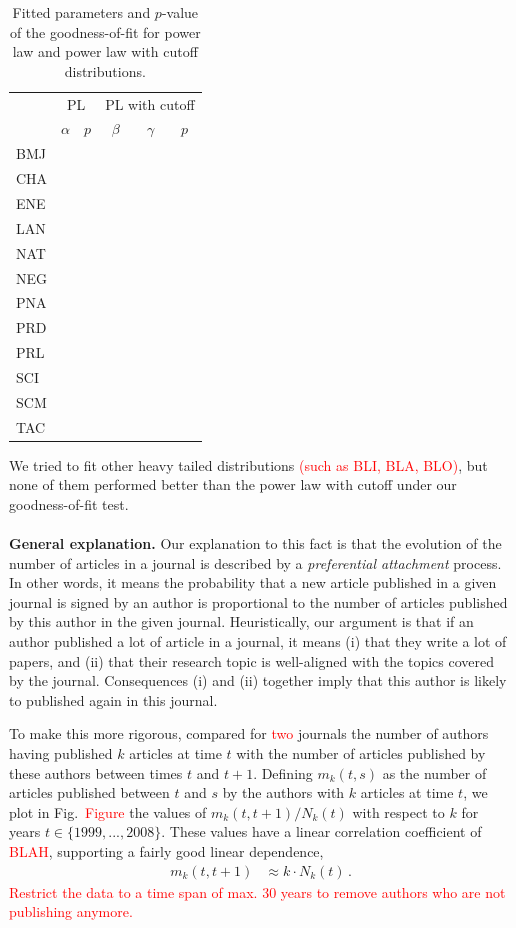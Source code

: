 \documentclass[aps,prl,floatfix,twocolumn]{revtex4-1}
\begin{document}
\begin{table}
 \begin{tabular}{l||c|c||c|c|c}
  & \multicolumn{2}{c||}{PL} & \multicolumn{3}{c}{PL with cutoff} \\
  & $\alpha$ & $p$ & $\beta$ & $\gamma$ & $p$ \\
  \hline
  \hline BMJ & &&&& \\
  \hline CHA & &&&& \\
  \hline ENE & &&&& \\
  \hline LAN & &&&& \\
  \hline NAT & &&&& \\
  \hline NEG & &&&& \\
  \hline PNA & &&&& \\
  \hline PRD & &&&& \\
  \hline PRL & &&&& \\
  \hline SCI & &&&& \\
  \hline SCM & &&&& \\
  \hline TAC & &&&&
 \end{tabular}
 \caption{Fitted parameters and $p$-value of the goodness-of-fit for power law and power law with cutoff distributions.}
 \label{tab:fit_gof}
\end{table}

We tried to fit other heavy tailed distributions \textcolor{red}{(such as BLI, BLA, BLO)}, but none of them performed better than the power law with cutoff under our goodness-of-fit test. 


\paragraph{}
{\bf General explanation. }
Our explanation to this fact is that the evolution of the number of articles in a journal is described by a \emph{preferential attachment} process. 
In other words, it means the probability that a new article published in a given journal 
is signed by an author is proportional to the number of articles published by this author in the given journal. 
Heuristically, our argument is that if an author published a lot of article in a journal, it means (i) that they write a lot of papers, 
and (ii) that their research topic is well-aligned with the topics covered by the journal. 
Consequences (i) and (ii) together imply that this author is likely to published again in this journal. 

To make this more rigorous, compared for \textcolor{red}{two} journals the number of authors having published $k$ articles at time $t$ 
with the number of articles published by these authors between times $t$ and $t+1$. 
Defining $m_k(t,s)$ as the number of articles published between $t$ and $s$ by the authors with $k$ articles at time $t$, we plot in Fig.~\textcolor{red}{Figure} the values of 
$m_k(t,t+1)/N_k(t)$ with respect to $k$ for years $t\in\{1999,...,2008\}$. 
These values have a linear correlation coefficient of \textcolor{red}{BLAH}, supporting a fairly good linear dependence, 
\begin{align}
 m_k(t,t+1) &\approx k\cdot N_k(t)\, . 
\end{align}
\textcolor{red}{Restrict the data to a time span of max. 30 years to remove authors who are not publishing anymore.}
\end{document}

